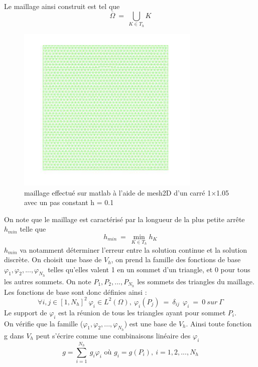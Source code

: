 \documentclass[a4paper,12pt,titlepage]{report}
\begin{document}
\begin{onehalfspace}
Le maillage ainsi construit est tel que
\[
\overline{\Omega} \ = \ \bigcup_{K \in T_{h}} K 
\]
\begin{figure}[h]
\begin{center}
\includegraphics[height = 8cm, keepaspectratio]{graphes/Maillage_initial.png} 
\caption{\label{figure 3 } maillage effectué sur matlab à l'aide de mesh2D d'un carré 1$\times$1.05 avec un pas constant h = 0.1}
\end{center}
\end{figure}

On note que le maillage est caractérisé par la longueur de la plus petite arrête $h_{min}$ telle que 
\[
h_{min} \ = \ \min_{K \in T_{h}} h_{K}
\]
$h_{min}$ va notamment déterminer l'erreur entre la solution continue et la solution discrète.
On choisit une base de $V_{h}$, on prend la famille des fonctions de base  \\ $\varphi_{1}, \varphi_{2}, ..., \varphi_{N_{h}}$  telles qu'elles valent 1 en un sommet d’un triangle, et 0 pour tous les autres sommets. On note $P_{1},P_{2}, ..., P_{N_{h}}$ les sommets des triangles du maillage.
Les fonctions de base sont donc définies ainsi :
\[
\forall i,j \in [1, N_{h}]^{2} \ \varphi_{i} \in L^{2}(\Omega),\ \varphi_{i}(P_{j}) \ = \ \delta_{ij} \ \
\varphi_{i} \ = \ 0 \ sur \ \Gamma \]
Le support de $ \varphi_{i}$ est la réunion de tous les triangles ayant pour sommet $P_{i}$.\\
On vérifie que la famille ($\varphi_{1}, \varphi_{2}, ..., \varphi_{N_{h}}$) est une base de $V_{h}$.
Ainsi toute fonction g dans $V_{h}$ peut s'écrire comme une combinaisons linéaire des $\varphi_{i}$
\[
g = \sum_{i=1}^{N_{h}}{\ g_{i}\varphi_{i}} \text{ \ \ où } g_{i} = g(P_{i}),\  i= 1,2,...,N_{h}
\]


\end{onehalfspace}
\end{document}
